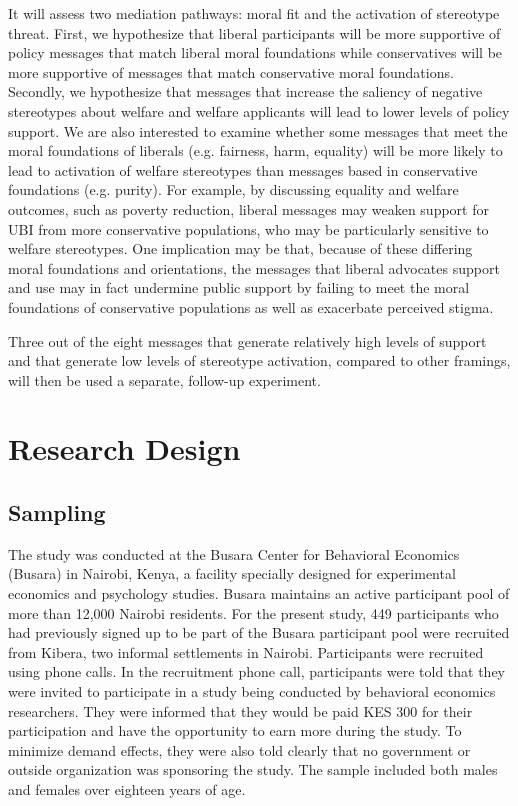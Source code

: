 \documentclass[11pt, a4paper]{article}\usepackage[]{graphicx}\usepackage[]{color}
\begin{document}
    It will assess two mediation pathways: moral fit and the activation of stereotype threat. First, we hypothesize that liberal participants will be more supportive of policy messages that match liberal moral foundations while conservatives will be more supportive of messages that match conservative moral foundations. Secondly, we hypothesize that messages that increase the saliency of negative stereotypes about welfare and welfare applicants will lead to lower levels of policy support.  We are also interested to examine whether some messages that meet the moral foundations of liberals (e.g. fairness, harm, equality) will be more likely to lead to activation of welfare stereotypes than messages based in conservative foundations (e.g. purity). For example, by discussing equality and welfare outcomes, such as poverty reduction, liberal messages may weaken support for UBI from more conservative populations, who may be particularly sensitive to welfare stereotypes. One implication may be that,  because of these differing moral foundations and orientations, the messages that liberal advocates support and use may in fact undermine public support by failing to meet the moral foundations of conservative populations as well as exacerbate perceived stigma.

    Three out of the eight messages that generate relatively high levels of support and that generate low levels of stereotype activation, compared to other framings, will then be used a separate, follow-up experiment. %

\section{Research Design}

    \subsection{Sampling}

        The study was conducted at the Busara Center for Behavioral Economics (Busara) in Nairobi, Kenya, a facility specially designed for experimental economics and psychology studies. Busara maintains an active participant pool of more than 12,000 Nairobi residents. For the present study, 449 participants who had previously signed up to be part of the Busara participant pool were recruited from Kibera, two informal settlements in Nairobi. Participants were recruited using phone calls. In the recruitment phone call, participants were told that they were invited to participate in a study being conducted by behavioral economics researchers. They were informed that they would be paid KES 300 for their participation and have the opportunity to earn more during the study. To minimize demand effects, they were also told clearly that no government or outside organization was sponsoring the study. The sample included both males and females over eighteen years of age.
\end{document}
